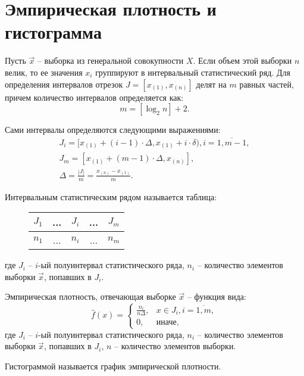 \chapter{Эмпирическая плотность и гистограмма}

Пусть $\vec x$ -- выборка из генеральной совокупности $X$. Если объем этой выборки $n$ велик, то ее значения $x_i$ группируют в интервальный статистический ряд. Для определения интервалов отрезок $J = [x_{(1)}, x_{(n)}]$ делят на $m$ равных частей, причем количество интервалов определяется как:
\begin{equation}
m = [\log_2 n] + 2.
\end{equation}

Сами интервалы определяются следующими выражениями:
\begin{gather}
J_i = [x_{(1)} + (i - 1) \cdot \Delta, x_{(1)} + i \cdot \delta), i = \overline {1, m - 1},\\
J_m = [x_{(1)} + (m - 1) \cdot \Delta, x_{(n)}],\\
\Delta = \frac{|J|}{m} = \frac{x_{(n)} - x_{(1)}}{m}.
\end{gather}

Интервальным статистическим рядом называется таблица:
\begin{figure}[H]
	\centering
	\begin{tabular}{|c|c|c|c|c|}
		\hline
		$J_1$ & ... & $J_i$ & ... & $J_m$ \\
		\hline
		$n_1$ & ... & $n_i$ & ... & $n_m$\\
		\hline
	\end{tabular}
\end{figure}
где $J_i$ -- $i$-ый полуинтервал статистического ряда, $n_i$ -- количество элементов выборки $\vec x$, попавших в $J_i$.

Эмпирическая плотность, отвечающая выборке $\vec x$ -- функция вида:
\begin{equation}
\hat f (x) = 
\begin{cases}
\displaystyle \frac{n_i}{n \Delta}, & x \in J_i, i = \overline{1, m},\\
0, & \text{иначе,}
\end{cases}
\end{equation}
где $J_i$ -- $i$-ый полуинтервал статистического ряда, $n_i$ -- количество элементов выборки $\vec x$, попавших в $J_i$, $n$ -- количество элементов выборки.

Гистограммой называется график эмпирической плотности.